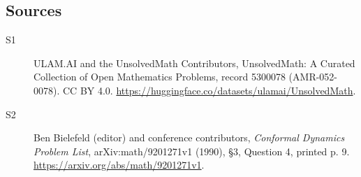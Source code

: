 \documentclass[11pt]{article}
\begin{document}
\subsection{Sources}
\begin{description}
\item[\hypertarget{source:5300078:1}{S1}] ULAM.AI and the UnsolvedMath Contributors, UnsolvedMath: A Curated Collection of Open Mathematics Problems, record 5300078 (AMR-052-0078). CC BY 4.0. \url{https://huggingface.co/datasets/ulamai/UnsolvedMath}.
\item[\hypertarget{source:5300078:2}{S2}] Ben Bielefeld (editor) and conference contributors, \emph{Conformal Dynamics Problem List}, arXiv:math/9201271v1 (1990), \S3, Question 4, printed p. 9. \url{https://arxiv.org/abs/math/9201271v1}.
\end{description}
\label{end:5300078}
\end{document}
